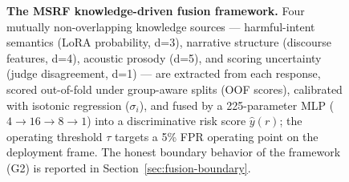 \begin{figure}[t]
\caption{\textbf{The MSRF knowledge-driven fusion framework.} Four mutually
non-overlapping knowledge sources --- harmful-intent semantics (LoRA
probability, d=3), narrative structure (discourse features, d=4), acoustic
prosody (d=5), and scoring uncertainty (judge disagreement, d=1) --- are
extracted from each response, scored out-of-fold under group-aware splits
(OOF scores), calibrated with isotonic regression ($\sigma_i$), and fused by a
225-parameter MLP ($4\to16\to8\to1$) into a discriminative risk score
$\hat{y}(r)$; the operating threshold $\tau$ targets a 5\% FPR operating point
on the deployment frame. The honest boundary behavior of the framework (G2) is
reported in Section~\ref{sec:fusion-boundary}.}
\label{fig:msrf-framework}
\end{figure}

